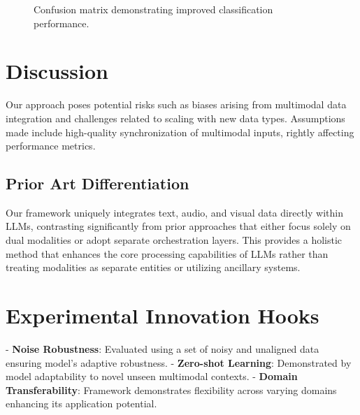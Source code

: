 \documentclass{article}
\begin{document}
\begin{figure}[h]
    \centering
    \caption{Confusion matrix demonstrating improved classification performance.}
    \label{fig:confusion_matrix}
\end{figure}

\section{Discussion}
Our approach poses potential risks such as biases arising from multimodal data integration and challenges related to scaling with new data types. Assumptions made include high-quality synchronization of multimodal inputs, rightly affecting performance metrics.

\subsection{Prior Art Differentiation}
Our framework uniquely integrates text, audio, and visual data directly within LLMs, contrasting significantly from prior approaches that either focus solely on dual modalities or adopt separate orchestration layers. This provides a holistic method that enhances the core processing capabilities of LLMs rather than treating modalities as separate entities or utilizing ancillary systems.

\section{Experimental Innovation Hooks}
- \textbf{Noise Robustness}: Evaluated using a set of noisy and unaligned data ensuring model's adaptive robustness.
- \textbf{Zero-shot Learning}: Demonstrated by model adaptability to novel unseen multimodal contexts.
- \textbf{Domain Transferability}: Framework demonstrates flexibility across varying domains enhancing its application potential.
\end{document}
